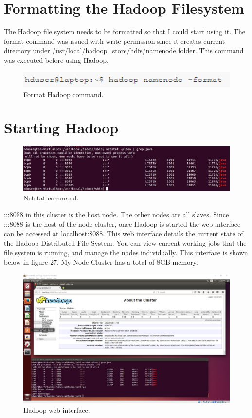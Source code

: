 \documentclass[12pt, letterpaper]{article}
\begin{document}
\section{Formatting the Hadoop Filesystem}

The Hadoop file system needs to be formatted so that I could start using it. The format command was issued with write permission since it creates current directory under /usr/local/hadoop\_store/hdfs/namenode folder. This command was executed before using Hadoop. 

\begin{figure}[H]
\centering
\includegraphics[width=12cm]{RH16}
\caption{Format Hadoop command.}
\label{fig:ij}
\end{figure}

\section{Starting Hadoop}

\begin{figure}[H]
\centering
\includegraphics[width=12cm]{proof.JPG}
\caption{Netstat command.}
\label{fig:netstat}
\end{figure}

:::8088 in this cluster is the host node. The other nodes are all slaves. Since :::8088 is the host of the node cluster, once Hadoop is started the web interface can be accessed at localhost:8088. This web interface details the current state of the Hadoop Distributed File System. You can view current working jobs that the file system is running, and manage the nodes individually. This interface is shown below in figure 27. My Node Cluster has a total of 8GB memory.

\begin{figure}[H]
\centering
\includegraphics[width=12cm]{moreproof.JPG}
\caption{Hadoop web interface.}
\label{fig:one}
\end{figure}
\end{document}
